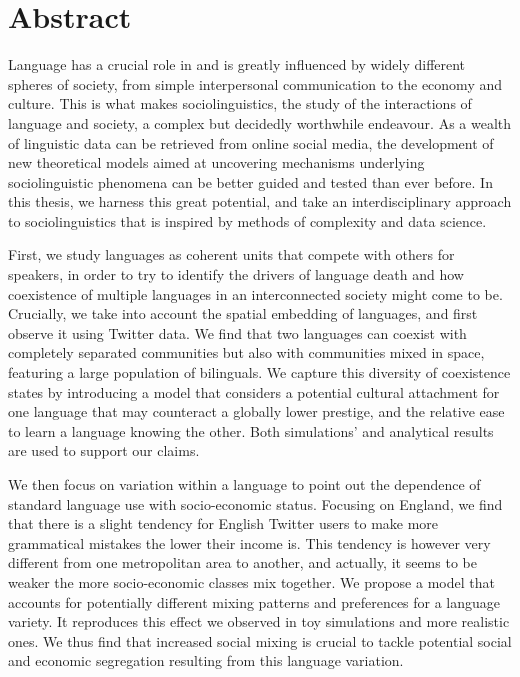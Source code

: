 \documentclass[../thesis.tex]{subfiles}
\begin{document}
\begingroup
\let\cleardoublepage\relax
\let\cleardoublepage\relax

\chapter*{Abstract}
Language has a crucial role in and is greatly influenced by widely different spheres of
society, from simple interpersonal communication to the economy and culture. This is
what makes sociolinguistics, the study of the interactions of language and society, a
complex but decidedly worthwhile endeavour. As a wealth of linguistic data can be
retrieved from online social media, the development of new theoretical models aimed at
uncovering mechanisms underlying sociolinguistic phenomena can be better guided and
tested than ever before. In this thesis, we harness this great potential, and take an
interdisciplinary approach to sociolinguistics that is inspired by methods of complexity
and data science.

First, we study languages as coherent units that compete with others for speakers, in
order to try to identify the drivers of language death and how coexistence of multiple
languages in an interconnected society might come to be. Crucially, we take into account
the spatial embedding of languages, and first observe it using Twitter data. We find
that two languages can coexist with completely separated communities but also with
communities mixed in space, featuring a large population of bilinguals. We capture this
diversity of coexistence states by introducing a model that considers a potential
cultural attachment for one language that may counteract a globally lower prestige, and
the relative ease to learn a language knowing the other. Both simulations' and
analytical results are used to support our claims.

We then focus on variation within a language to point out the dependence of standard
language use with socio-economic status. Focusing on England, we find
that there is a slight tendency for English Twitter users to make more grammatical
mistakes the lower their income is. This tendency is however very different from one
metropolitan area to another, and actually, it seems to be weaker the more
socio-economic classes mix together. We propose a model that accounts for potentially
different mixing patterns and preferences for a language variety. It reproduces this
effect we observed in toy simulations and more realistic ones.
We thus find that increased social mixing is crucial to tackle potential social and
economic segregation resulting from this language variation.
\end{document}
